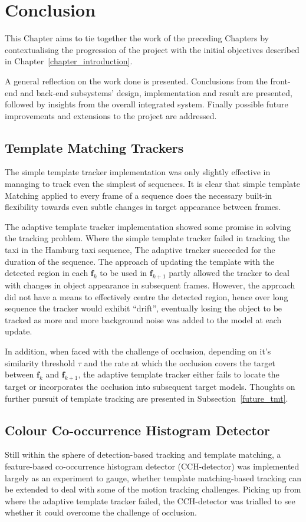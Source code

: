 \chapter{Conclusion}\label{chapter_conclusion}
This Chapter aims to tie together the work of the preceding Chapters
by contextualising the progression of the project with the initial objectives 
described in Chapter~\ref{chapter_introduction}.

A general reflection on the work done is presented. Conclusions from
the front-end and back-end subsystems' design, implementation and result are
presented, followed by insights from the overall integrated system. Finally
possible future improvements and extensions to the project are addressed.

\section{Template Matching Trackers}
The simple template tracker implementation was only slightly effective in
managing to track even the simplest of sequences. It is clear that simple template
Matching applied to every frame of a sequence does the necessary built-in
flexibility towards even subtle changes in target appearance between frames.

The adaptive template tracker implementation showed some promise in solving the
tracking problem. Where the simple template tracker failed in tracking the
taxi in the Hamburg taxi sequence, The adaptive tracker succeeded for the
duration of the sequence. 
The approach of updating the template with the detected region in each
$\mathbf{f}_k$ to be used in $\mathbf{f}_{k+1}$ partly allowed the tracker to
deal with changes in object appearance in subsequent frames. However, the
approach did not have a means to effectively centre the detected region, hence
over long sequence the tracker would exhibit ``drift'', eventually losing the
object to be tracked as more and more background noise was added to the model at
each update.

In addition, when faced with the challenge of occlusion, depending on it's
similarity threshold $\tau$ and the rate at which the occlusion covers the
target between $\mathbf{f}_k$ and $\mathbf{f}_{k+1}$, the adaptive template
tracker either fails to locate the target or incorporates the occlusion into
subsequent target models. Thoughts on further pursuit of template tracking are
presented in Subsection~\ref{future_tmt}.

\section{Colour Co-occurrence Histogram Detector}
Still within the sphere of detection-based tracking and template matching, a
feature-based co-occurrence histogram detector (CCH-detector) was implemented largely as an
experiment to gauge, whether template matching-based tracking can be extended to deal
with some of the motion tracking challenges. 
Picking up from where the adaptive template tracker failed, the CCH-detector was
trialled to see whether it could overcome the challenge of occlusion.


